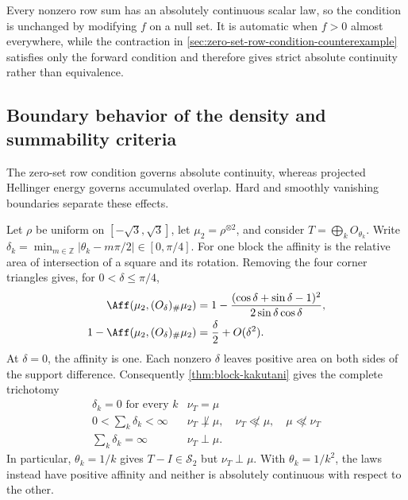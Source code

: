 Every nonzero row sum has an absolutely continuous scalar law, so the
condition is unchanged by modifying \(f\) on a null set.  It is automatic when
\(f>0\) almost everywhere, while the contraction in
\cref{sec:zero-set-row-condition-counterexample} satisfies only the forward
condition and therefore gives strict absolute continuity rather than
equivalence.

\subsection{Boundary behavior of the density and summability criteria}
\label{sec:boundary-behavior-and-summability}

The zero-set row condition governs absolute continuity, whereas projected
Hellinger energy governs accumulated overlap.  Hard and smoothly vanishing
boundaries separate these effects.

Let \(\rho\) be uniform on \([-\sqrt3,\sqrt3]\), let
\(\mu_2=\rho^{\otimes2}\), and consider \(T=\bigoplus_kO_{\theta_k}\).
Write
\(\delta_k=\min_{m\in\mathbb Z}|\theta_k-m\pi/2|\in[0,\pi/4]\).
For one block the affinity is the relative area of intersection
of a square and its rotation.
Removing the four corner triangles gives, for \(0<\delta\leq\pi/4\),
\begin{equation}
 \begin{aligned}
 \Aff(\mu_2,(O_\delta)_\#\mu_2)
 &=1-\frac{(\cos\delta+\sin\delta-1)^2}
                {2\sin\delta\cos\delta},\\
 1-\Aff(\mu_2,(O_\delta)_\#\mu_2)
 &=\frac{\delta}{2}+O(\delta^2).
 \end{aligned}
 \label{eq:uniform-square-rotation-affinity}
\end{equation}
At \(\delta=0\), the affinity is one.  Each nonzero \(\delta\) leaves
positive area on both sides of the support difference.
Consequently \cref{thm:block-kakutani} gives the complete trichotomy
\begin{equation}
 \begin{array}{c|l}
  \delta_k=0\text{ for every }k&\nu_T=\mu\\
  0<\sum_k\delta_k<\infty&
      \nu_T\not\perp\mu,\quad \nu_T\not\ll\mu,\quad\mu\not\ll\nu_T\\
  \sum_k\delta_k=\infty&\nu_T\perp\mu.
 \end{array}
 \label{eq:uniform-square-block-trichotomy}
\end{equation}
In particular, \(\theta_k=1/k\) gives \(T-I\in\mathcal S_2\) but
\(\nu_T\perp\mu\).
With \(\theta_k=1/k^2\), the laws instead have positive affinity
and neither is absolutely continuous with respect to the other.

